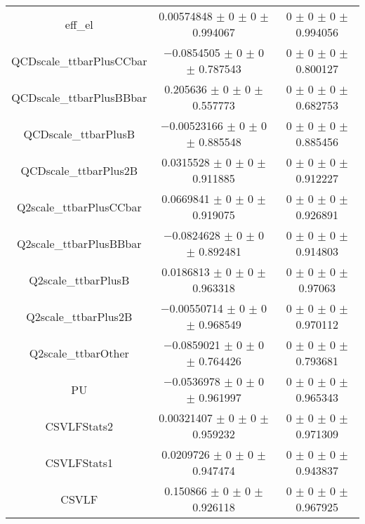 \begin{table}
\begin{tabular}{ccc}
eff\_el 	& \num{0.00574848} $\pm$ \num{0} $\pm$ \num{0} $\pm$ \num{0.994067} 	& \num{0} $\pm$ \num{0} $\pm$ \num{0} $\pm$ \num{0.994056}\\
QCDscale\_ttbarPlusCCbar 	& \num{-0.0854505} $\pm$ \num{0} $\pm$ \num{0} $\pm$ \num{0.787543} 	& \num{0} $\pm$ \num{0} $\pm$ \num{0} $\pm$ \num{0.800127}\\
QCDscale\_ttbarPlusBBbar 	& \num{0.205636} $\pm$ \num{0} $\pm$ \num{0} $\pm$ \num{0.557773} 	& \num{0} $\pm$ \num{0} $\pm$ \num{0} $\pm$ \num{0.682753}\\
QCDscale\_ttbarPlusB 	& \num{-0.00523166} $\pm$ \num{0} $\pm$ \num{0} $\pm$ \num{0.885548} 	& \num{0} $\pm$ \num{0} $\pm$ \num{0} $\pm$ \num{0.885456}\\
QCDscale\_ttbarPlus2B 	& \num{0.0315528} $\pm$ \num{0} $\pm$ \num{0} $\pm$ \num{0.911885} 	& \num{0} $\pm$ \num{0} $\pm$ \num{0} $\pm$ \num{0.912227}\\
Q2scale\_ttbarPlusCCbar 	& \num{0.0669841} $\pm$ \num{0} $\pm$ \num{0} $\pm$ \num{0.919075} 	& \num{0} $\pm$ \num{0} $\pm$ \num{0} $\pm$ \num{0.926891}\\
Q2scale\_ttbarPlusBBbar 	& \num{-0.0824628} $\pm$ \num{0} $\pm$ \num{0} $\pm$ \num{0.892481} 	& \num{0} $\pm$ \num{0} $\pm$ \num{0} $\pm$ \num{0.914803}\\
Q2scale\_ttbarPlusB 	& \num{0.0186813} $\pm$ \num{0} $\pm$ \num{0} $\pm$ \num{0.963318} 	& \num{0} $\pm$ \num{0} $\pm$ \num{0} $\pm$ \num{0.97063}\\
Q2scale\_ttbarPlus2B 	& \num{-0.00550714} $\pm$ \num{0} $\pm$ \num{0} $\pm$ \num{0.968549} 	& \num{0} $\pm$ \num{0} $\pm$ \num{0} $\pm$ \num{0.970112}\\
Q2scale\_ttbarOther 	& \num{-0.0859021} $\pm$ \num{0} $\pm$ \num{0} $\pm$ \num{0.764426} 	& \num{0} $\pm$ \num{0} $\pm$ \num{0} $\pm$ \num{0.793681}\\
PU 	& \num{-0.0536978} $\pm$ \num{0} $\pm$ \num{0} $\pm$ \num{0.961997} 	& \num{0} $\pm$ \num{0} $\pm$ \num{0} $\pm$ \num{0.965343}\\
CSVLFStats2 	& \num{0.00321407} $\pm$ \num{0} $\pm$ \num{0} $\pm$ \num{0.959232} 	& \num{0} $\pm$ \num{0} $\pm$ \num{0} $\pm$ \num{0.971309}\\
CSVLFStats1 	& \num{0.0209726} $\pm$ \num{0} $\pm$ \num{0} $\pm$ \num{0.947474} 	& \num{0} $\pm$ \num{0} $\pm$ \num{0} $\pm$ \num{0.943837}\\
CSVLF 	& \num{0.150866} $\pm$ \num{0} $\pm$ \num{0} $\pm$ \num{0.926118} 	& \num{0} $\pm$ \num{0} $\pm$ \num{0} $\pm$ \num{0.967925}\\

\end{tabular}
\end{table}
